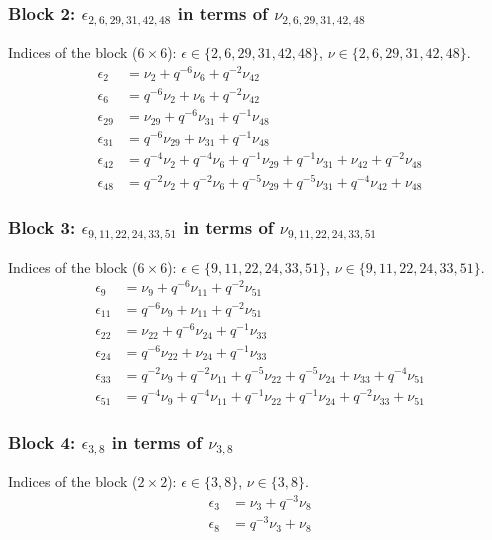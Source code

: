 \subsubsection{Block 2: $\epsilon_{2, 6, 29, 31, 42, 48}$ in terms of $\nu_{2, 6, 29, 31, 42, 48}$}
Indices of the block ($6\times 6$): $\epsilon \in \{2, 6, 29, 31, 42, 48\}$, $\nu \in \{2, 6, 29, 31, 42, 48\}$.
\begin{align*}
\epsilon_{2} &= \nu_{2} + q^{-6}\nu_{6} + q^{-2}\nu_{42}\\
\epsilon_{6} &= q^{-6}\nu_{2} + \nu_{6} + q^{-2}\nu_{42}\\
\epsilon_{29} &= \nu_{29} + q^{-6}\nu_{31} + q^{-1}\nu_{48}\\
\epsilon_{31} &= q^{-6}\nu_{29} + \nu_{31} + q^{-1}\nu_{48}\\
\epsilon_{42} &= q^{-4}\nu_{2} + q^{-4}\nu_{6} + q^{-1}\nu_{29} + q^{-1}\nu_{31} + \nu_{42} + q^{-2}\nu_{48}\\
\epsilon_{48} &= q^{-2}\nu_{2} + q^{-2}\nu_{6} + q^{-5}\nu_{29} + q^{-5}\nu_{31} + q^{-4}\nu_{42} + \nu_{48}
\end{align*}

\subsubsection{Block 3: $\epsilon_{9, 11, 22, 24, 33, 51}$ in terms of $\nu_{9, 11, 22, 24, 33, 51}$}
Indices of the block ($6\times 6$): $\epsilon \in \{9, 11, 22, 24, 33, 51\}$, $\nu \in \{9, 11, 22, 24, 33, 51\}$.
\begin{align*}
\epsilon_{9} &= \nu_{9} + q^{-6}\nu_{11} + q^{-2}\nu_{51}\\
\epsilon_{11} &= q^{-6}\nu_{9} + \nu_{11} + q^{-2}\nu_{51}\\
\epsilon_{22} &= \nu_{22} + q^{-6}\nu_{24} + q^{-1}\nu_{33}\\
\epsilon_{24} &= q^{-6}\nu_{22} + \nu_{24} + q^{-1}\nu_{33}\\
\epsilon_{33} &= q^{-2}\nu_{9} + q^{-2}\nu_{11} + q^{-5}\nu_{22} + q^{-5}\nu_{24} + \nu_{33} + q^{-4}\nu_{51}\\
\epsilon_{51} &= q^{-4}\nu_{9} + q^{-4}\nu_{11} + q^{-1}\nu_{22} + q^{-1}\nu_{24} + q^{-2}\nu_{33} + \nu_{51}
\end{align*}

\subsubsection{Block 4: $\epsilon_{3, 8}$ in terms of $\nu_{3, 8}$}
Indices of the block ($2\times 2$): $\epsilon \in \{3, 8\}$, $\nu \in \{3, 8\}$.
\begin{align*}
\epsilon_{3} &= \nu_{3} + q^{-3}\nu_{8}\\
\epsilon_{8} &= q^{-3}\nu_{3} + \nu_{8}
\end{align*}

